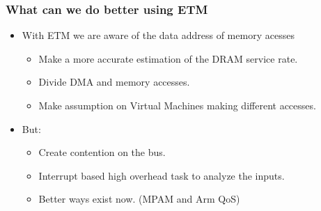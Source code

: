 \documentclass{beamer}
\begin{document}
\begin{frame}
    \frametitle{What can we do better using ETM}
    \begin{itemize}
        \item With ETM we are aware of the data address of memory acesses
            \begin{itemize}
                \item Make a more accurate estimation of the DRAM service rate.
                \item Divide DMA and memory accesses.
                \item Make assumption on Virtual Machines making different
                    accesses.
            \end{itemize}
        \item But:
            \begin{itemize}
                \item Create contention on the bus.
                \item Interrupt based high overhead task to analyze the inputs.
                \item Better ways exist now. (MPAM and Arm QoS)
            \end{itemize}
    \end{itemize}
\end{frame}
\end{document}
